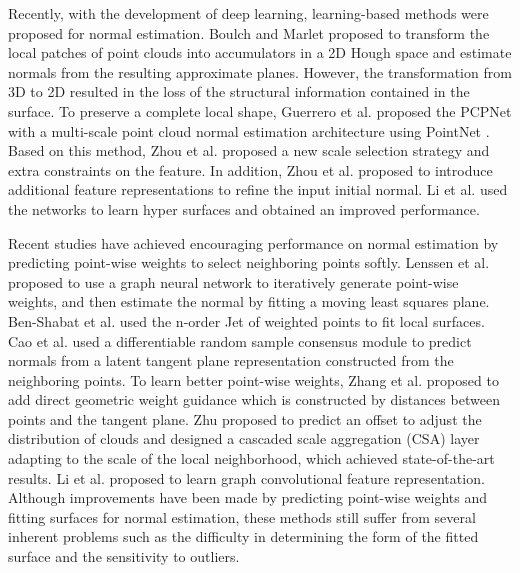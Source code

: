 \documentclass[letterpaper]{article} \usepackage{aaai23}  \usepackage{times}  \usepackage{helvet}  \usepackage{courier}  \usepackage[hyphens]{url}  \usepackage{graphicx} \urlstyle{rm} \def\UrlFont{\rm}  \usepackage{natbib}  \usepackage{caption} \frenchspacing  \setlength{\pdfpagewidth}{8.5in} \setlength{\pdfpageheight}{11in} \usepackage{algorithm}
\begin{document}
Recently, with the development of deep learning, learning-based methods were proposed for normal estimation. Boulch and Marlet   proposed to transform the local patches of point clouds into accumulators in a 2D Hough space and estimate normals from the resulting approximate planes. However, the transformation from 3D to 2D resulted in the loss of the structural information contained in the surface. To preserve a complete local shape, Guerrero et al.  proposed the PCPNet with a multi-scale point cloud normal estimation architecture using PointNet \cite{CharlesRQi2016PointNetDL}. Based on this method, Zhou et al.  proposed a new scale selection strategy and extra constraints on the feature. In addition, Zhou et al.  proposed to introduce additional feature representations to refine the input initial normal. Li et al.  used the networks to learn hyper surfaces and obtained an improved performance.

Recent studies have achieved encouraging performance on normal estimation by predicting point-wise weights to select neighboring points softly. Lenssen et al.  proposed to use a graph neural network to iteratively generate point-wise weights, and then estimate the normal by fitting a moving least squares plane. Ben-Shabat et al.  used the n-order Jet of weighted points to fit local surfaces. Cao et al.  used a differentiable random sample consensus module to predict normals from a latent tangent plane representation constructed from the neighboring points. To learn better point-wise weights, Zhang et al.   proposed to add direct geometric weight guidance which is constructed by distances between points and the tangent plane. Zhu  proposed to predict an offset to adjust the distribution of clouds and designed a cascaded scale aggregation (CSA) layer adapting to the scale of the local neighborhood, which achieved state-of-the-art results. Li et al.  proposed to learn graph convolutional feature representation. Although improvements have been made by predicting point-wise weights and fitting surfaces for normal estimation, these methods still suffer from several inherent problems such as the difficulty in determining the form of the fitted surface and the sensitivity to outliers.
\end{document}
